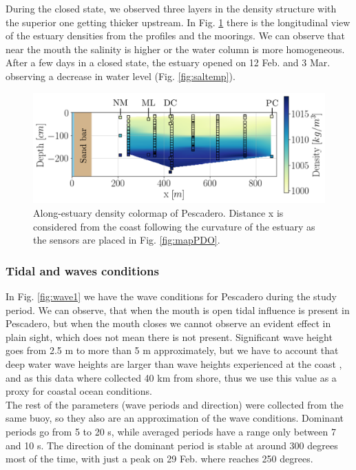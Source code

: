 \documentclass[tesis.tex]{subfiles}
\begin{document}
During the closed state, we observed three layers in the density structure with the superior one getting thicker upstream. In Fig. \ref{fig:perfiles1} there is the longitudinal view of the estuary densities from the profiles and the moorings. We can observe that near the mouth the salinity is higher or the water column is more homogeneous. After a few days in a closed state, the estuary opened on 12 Feb. and 3 Mar. observing a decrease in water level (Fig. \ref{fig:saltemp}). \\

\begin{figure}[h!]
    \centering
    \includegraphics[scale=0.6]{Imagenes/vista_long2.png}
    \caption{Along-estuary density colormap of Pescadero. Distance x is considered from the coast following the curvature of the estuary as the sensors are placed in Fig. \ref{fig:mapPDO}. }
    \label{fig:perfiles1}
\end{figure}

\subsubsection{Tidal and waves conditions}

In Fig. \ref{fig:wave1} we have the wave conditions for Pescadero during the study period. We can observe, that when the mouth is open tidal influence is present in Pescadero, but when the mouth closes we cannot observe an evident effect in plain sight, which does not mean there is not present. Significant wave height goes from 2.5 m to more than 5 m approximately, but we have to account that deep water wave heights are larger than wave heights experienced at the coast \citep{Williams2014}, and as this data where collected 40 km from shore, thus we use this value as a proxy for coastal ocean conditions.  \\

The rest of the parameters (wave periods and direction) were collected from the same buoy, so they also are an approximation of the wave conditions. Dominant periods go from 5 to 20 s, while averaged periods have a range only between 7 and 10 s. The direction of the dominant period is stable at around 300 degrees most of the time, with just a peak on 29 Feb. where reaches 250 degrees.\\
\end{document}
